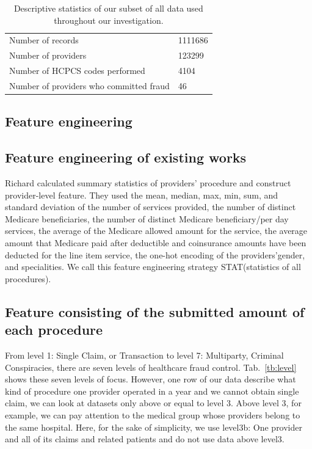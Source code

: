\documentclass[dvipdfmx, english]{ampmt}             %
\newcommand{\Tabref}[1]{Tab.~\ref{#1}}
\begin{document}
\begin{table}[H]
\centering
\caption{Descriptive statistics of our subset of all data used throughout our investigation.}
\begin{tabular}{ll}
\hline \hline
Number of records & 1111686 \\
Number of providers & 123299 \\
Number of HCPCS codes performed & 4104\\
Number of providers who committed fraud & 46 \\
 \hline
\end{tabular}
\label{tb:subset}
\end{table}

\subsection{Feature engineering}

\subsection*{Feature engineering of existing works}

Richard \cite{RichardUnsupervised} calculated summary statistics of providers' procedure and construct provider\--level feature. They used the mean, median, max, min, sum, and standard deviation of 
the number of services provided, the number of distinct Medicare beneficiaries, the number of distinct Medicare beneficiary/per day services, the average of the Medicare allowed amount for the service, 
the average amount that Medicare paid after deductible and coinsurance amounts have been deducted for the line item service, the one-hot encoding of the providers'{}gender, and specialities. 
We call this feature engineering strategy STAT(statistics of all procedures).


\subsection*{Feature consisting of the submitted amount of each procedure}
From level 1: Single Claim, or Transaction to level 7: Multiparty, Criminal Conspiracies, there are seven levels of healthcare fraud control\cite{Survey, Multidim}. \Tabref{tb:level} shows these seven levels of focus. 
However, one row of our data describe what kind of procedure one provider operated in a year and we cannot obtain single claim, we can look at datasets only above or equal to level 3. Above level 3, for example, we can pay attention to the medical group whose providers belong to the same hospital. Here, for the sake of simplicity, we use level3b: One provider and all of its claims and related patients and do not use data above level3.
\end{document}

